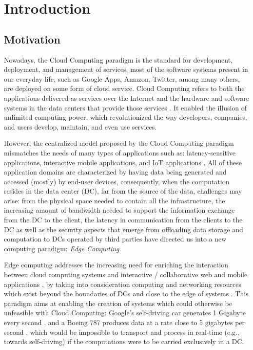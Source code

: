 

\chapter{Introduction}
\label{cha:introduction}

\section{Motivation}

Nowadays, the Cloud Computing paradigm is the standard for development, deployment, and management of services, most of the software systems present in our everyday life, such as Google Apps, Amazon, Twitter, among many others, are deployed on some form of cloud service. Cloud Computing refers to both the applications delivered as services over the Internet and the hardware and software systems in the data centers that provide those services \cite{10.1145/1721654.1721672}. It enabled the illusion of unlimited computing power, which revolutionized the way developers, companies, and users develop, maintain, and even use services.

However, the centralized model proposed by the Cloud Computing paradigm mismatches the needs of many types of applications  such as: latency-sensitive applications, interactive mobile applications, and IoT applications \cite{10.1145/3154815}. All of these application domains are characterized by having data being generated and accessed (mostly) by end-user devices, consequently, when the computation resides in the data center (DC), far from the source of the data, challenges may arise: from the physical space needed to contain all the infrastructure, the increasing amount of bandwidth needed to support the information exchange from the DC to the client, the latency in communication from the clients to the DC as well as the security aspects that emerge from offloading data storage and computation to DCs operated by third parties have directed us into a new computing paradigm: \textit{Edge Computing}.

Edge computing addresses the increasing need for enriching the interaction between cloud computing systems and interactive / collaborative web and mobile applications \cite{10.1145/242857.242867}, by taking into consideration  computing and networking resources which exist beyond the boundaries of DCs and close to the edge of systems \cite{Leitao2018} \cite{7488250}. This paradigm aims at enabling the creation of systems which could otherwise be unfeasible with Cloud Computing: Google's self-driving car generates 1 Gigabyte every second \cite{datafloq}, and a Boeing 787 produces data at a rate close to 5 gigabytes per second \cite{finnegan_2013}, which would be impossible to transport and process in real-time (e.g., towards self-driving) if the computations were to be carried exclusively in a DC. 

